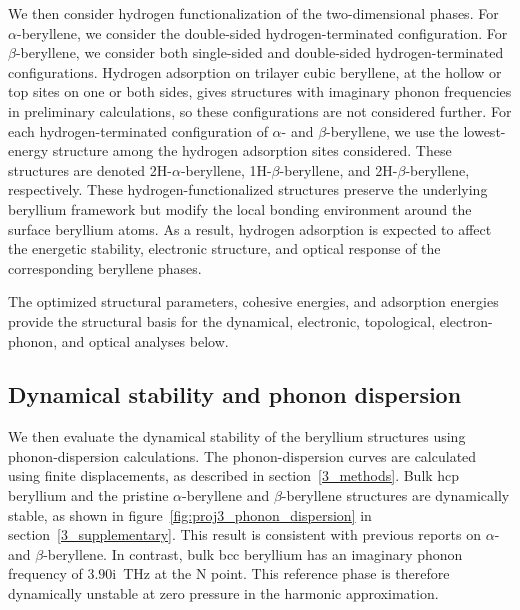 We then consider hydrogen functionalization of the two-dimensional phases.
For $\alpha$-beryllene,
we consider the double-sided hydrogen-terminated configuration.
For $\beta$-beryllene,
we consider both single-sided and double-sided hydrogen-terminated configurations.
Hydrogen adsorption on trilayer cubic beryllene,
at the hollow or top sites on one or both sides,
gives structures with imaginary phonon frequencies in preliminary calculations,
so these configurations are not considered further.
For each hydrogen-terminated configuration of $\alpha$- and $\beta$-beryllene,
we use the lowest-energy structure among the hydrogen adsorption sites considered.
These structures are denoted 2H-$\alpha$-beryllene,
1H-$\beta$-beryllene,
and 2H-$\beta$-beryllene,
respectively.
These hydrogen-functionalized structures preserve the underlying beryllium framework but modify the local bonding environment around the surface beryllium atoms.
As a result,
hydrogen adsorption is expected to affect the energetic stability,
electronic structure,
and optical response of the corresponding beryllene phases.

The optimized structural parameters, cohesive energies,
and adsorption energies provide the structural basis for the dynamical,
electronic, topological, electron-phonon, and optical analyses below.

\subsection{Dynamical stability and phonon dispersion}
\label{3_dynamical_stability_and_phonon_dispersion}

We then evaluate the dynamical stability of the beryllium structures using phonon-dispersion calculations.
The phonon-dispersion curves are calculated using finite displacements,
as described in section~\ref{3_methods}.
Bulk hcp beryllium and the pristine $\alpha$-beryllene and $\beta$-beryllene structures are dynamically stable,
as shown in figure~\ref{fig:proj3_phonon_dispersion} in section~\ref{3_supplementary}.
This result is consistent with previous reports on $\alpha$- and $\beta$-beryllene.
In contrast,
bulk bcc beryllium has an imaginary phonon frequency of $3.90\mathrm{i}$~\si{\tera\hertz} at the $\mathrm{N}$ point.
This reference phase is therefore dynamically unstable at zero pressure in the harmonic approximation.

